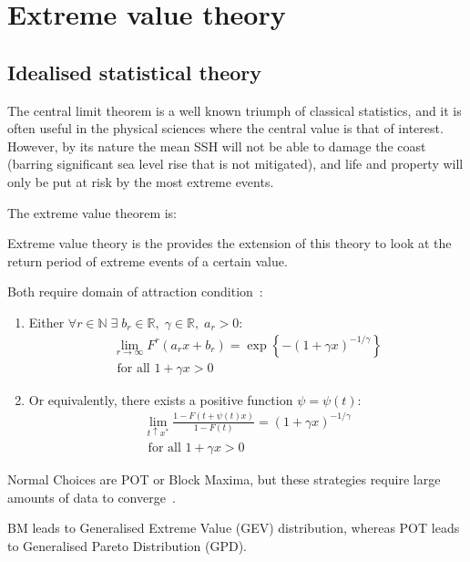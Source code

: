 \section{Extreme value theory}
\label{sec:evt}
\subsection{Idealised statistical theory}
The central limit theorem is a well known triumph of classical statistics,
and it is often useful in the physical sciences where the central value
is that of interest. However, by its nature the mean SSH will
not be able to damage the coast (barring significant sea level rise that is not mitigated),
and life and property will only be put
at risk by the most extreme events.

The extreme value theorem is:



Extreme value theory is the provides the extension of this theory
to look at the return period of extreme events of a certain value.

Both require domain of attraction condition~\cite{bucher2018horse}:

\begin{enumerate}
  \item Either $\forall r \in \mathbb{N} \;\exists \;b_r \in \mathbb{R},\; \gamma\in \mathbb{R},\; a_r>0: $
    \begin{eqnarray}
    \lim _{r \rightarrow \infty} F^{r}\left(a_{r} x+b_{r}\right)=\exp \left\{-(1+\gamma x)^{-1 / \gamma}\right\} \\
     \text { for all } 1+\gamma x>0
    \tag{BM}
    \end{eqnarray}

  \item Or equivalently, there exists a positive function $\psi=\psi (t):$
    \begin{eqnarray}
    \lim _{t \uparrow x^{*}} \frac{1-F(t+\psi(t) x)}{1-F(t)}=(1+\gamma x)^{-1 / \gamma} \\
    \text { for all } 1+\gamma x>0
    \tag{POT}
    \end{eqnarray}
 \end{enumerate}

Normal Choices are POT or Block Maxima, but these strategies require
large amounts of data to converge~\cite{taleb2019much}.

BM leads to Generalised Extreme Value (GEV) distribution,
      whereas POT leads to Generalised Pareto Distribution (GPD).

